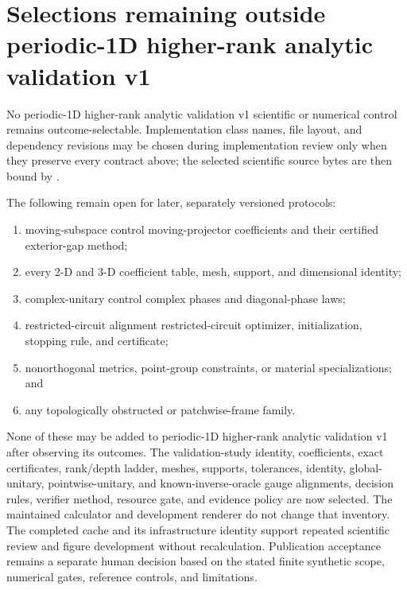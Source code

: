\documentclass[11pt]{article}
\begin{document}
\section{Selections remaining outside periodic-1D higher-rank analytic validation v1}

No periodic-1D higher-rank analytic validation v1 scientific or numerical control remains outcome-selectable. Implementation
class names, file layout, and dependency revisions may be chosen during implementation
review only when they preserve every contract above; the selected scientific source
bytes are then bound by .

The following remain open for later, separately versioned protocols:

\begin{enumerate}
\item moving-subspace control moving-projector coefficients and their certified exterior-gap method;
\item every 2-D and 3-D coefficient table, mesh, support, and dimensional identity;
\item complex-unitary control complex phases and diagonal-phase laws;
\item restricted-circuit alignment restricted-circuit optimizer, initialization, stopping rule, and certificate;
\item nonorthogonal metrics, point-group constraints, or material specializations; and
\item any topologically obstructed or patchwise-frame family.
\end{enumerate}

None of these may be added to periodic-1D higher-rank analytic validation v1 after observing its outcomes. The validation-study identity,
coefficients, exact certificates, rank/depth ladder, meshes, supports, tolerances,
identity, global-unitary, pointwise-unitary, and known-inverse-oracle gauge alignments, decision rules, verifier method, resource gate, and evidence policy are
now selected. The maintained calculator and development renderer do not change that
inventory. The completed cache and its infrastructure identity support repeated
scientific review and figure development without recalculation. Publication acceptance
remains a separate human decision based on the stated finite synthetic scope, numerical
gates, reference controls, and limitations.
\end{document}
